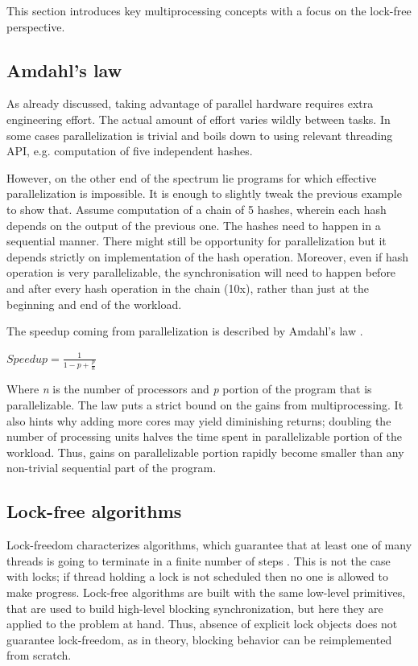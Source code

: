 \documentclass[12pt,a4paper,twoside]{report}
\begin{document}
This section introduces key multiprocessing concepts with a focus on the lock-free perspective. 

\subsection{Amdahl's law}
As already discussed, taking advantage of parallel hardware requires extra engineering effort. The actual amount of effort varies wildly between tasks. In some cases parallelization is trivial and boils down to using relevant threading API, e.g. computation of five independent hashes. 

However, on the other end of the spectrum lie programs for which effective parallelization is impossible. It is enough to slightly tweak the previous example to show that. Assume computation of a chain of 5 hashes, wherein each hash depends on the output of the previous one. The hashes need to happen in a sequential manner. There might still be opportunity for parallelization but it depends strictly on implementation of the hash operation. Moreover, even if hash operation is very parallelizable, the synchronisation will need to happen before and after every hash operation in the chain (10x), rather than just at the beginning and end of the workload. 

The speedup coming from parallelization is described by Amdahl's law \cite{art_of_mult}.

\begin{center}
$Speedup = \frac{1}{1 - p + \frac{p}{n}}$
\end{center} 

Where \textit{n} is the number of processors and \textit{p} portion of the program that is parallelizable. The law puts a strict bound on the gains from multiprocessing. It also hints why adding more cores may yield diminishing returns; doubling the number of processing units halves the time spent in parallelizable portion of the workload. Thus, gains on parallelizable portion rapidly become smaller than any non-trivial sequential part of the program. 

\subsection{Lock-free algorithms}
Lock-freedom characterizes algorithms, which guarantee that at least one of many threads is going to terminate in a finite number of steps \cite{art_of_mult}. This is not the case with locks; if thread holding a lock is not scheduled then no one is allowed to make progress. Lock-free algorithms are built with the same low-level primitives, that are used to build high-level blocking synchronization, but here they are applied to the problem at hand. Thus, absence of explicit lock objects does not guarantee lock-freedom, as in theory, blocking behavior can be reimplemented from scratch. 
\end{document}
